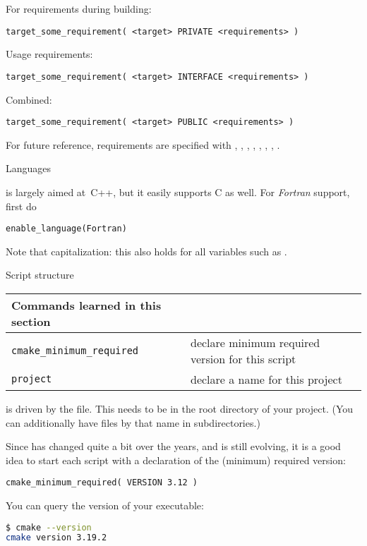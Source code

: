 For requirements during building:
\begin{lstlisting}
target_some_requirement( <target> PRIVATE <requirements> )
\end{lstlisting}
Usage requirements:
\begin{lstlisting}
target_some_requirement( <target> INTERFACE <requirements> )
\end{lstlisting}
Combined:
\begin{lstlisting}
target_some_requirement( <target> PUBLIC <requirements> )
\end{lstlisting}
For future reference, requirements are specified with
,
,
,
,
,
,
,
.

 {Languages}

 is largely aimed at~C++, but it easily supports C as well.
For \emph{Fortran} support,
first do
\begin{lstlisting}
enable_language(Fortran)
\end{lstlisting}
Note that capitalization: this also holds for all variables
such as .

 {Script structure}

\begin{tabular}{lp{3in}}
  \toprule
  Commands learned in this section\\
  \midrule
  \lstinline+cmake_minimum_required+&declare minimum required version for this script\\
  \lstinline+project+&declare a name for this project\\
  \bottomrule
\end{tabular}

 is driven by the  file.
This needs to be in the root directory of your project.
(You can additionally have files by that name in subdirectories.)

Since  has changed quite a bit over the years,
and is still evolving,
it is a good idea to start each script with a declaration
of the (minimum) required version:
\begin{lstlisting}
cmake_minimum_required( VERSION 3.12 )
\end{lstlisting}
You can query the version of your  executable:
\begin{lstlisting}[language=bash]
$ cmake --version
cmake version 3.19.2
\end{lstlisting}

